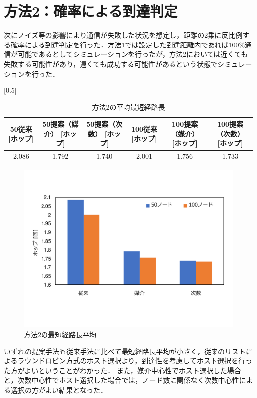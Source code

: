 \section{方法2：確率による到達判定}
次にノイズ等の影響により通信が失敗した状況を想定し，距離の2乗に反比例する確率による到達判定を行った．方法1では設定した到達距離内であれば100\%通信が可能であるとしてシミュレーションを行ったが，方法2においては近くても失敗する可能性があり，遠くても成功する可能性があるという状態でシミュレーションを行った．

\begin{table}[H]
    \centering
  \caption{方法2の平均最短経路長}
\scalebox{0.5}[0.5]{
  \begin{tabular}{c|c|c|c|c|c} \hline\hline
       50従来 [ホップ] &50提案（媒介） [ホップ]&50提案（次数） [ホップ] &100従来 [ホップ]& 100提案（媒介） [ホップ]& 100提案（次数） [ホップ] \\ \hline 
       2.086 & 1.792 & 1.740 & 2.001 & 1.756 & 1.733\\ \hline\hline
  \end{tabular}
  }
  \label{tab:2_spl}
\end{table}


\begin{figure}[H]
  \centering
  \includegraphics[width=1\textwidth]{figures/2hop.pdf}
    \vspace{-20mm}
  \caption{方法2の最短経路長平均}   
  \label{fig:2hop}
\end{figure}

いずれの提案手法も従来手法に比べて最短経路長平均が小さく，従来のリストによるラウンドロビン方式のホスト選択より，到達性を考慮してホスト選択を行った方がよいということがわかった．
また，媒介中心性でホスト選択した場合と，次数中心性でホスト選択した場合では，ノード数に関係なく次数中心性による選択の方がよい結果となった．


